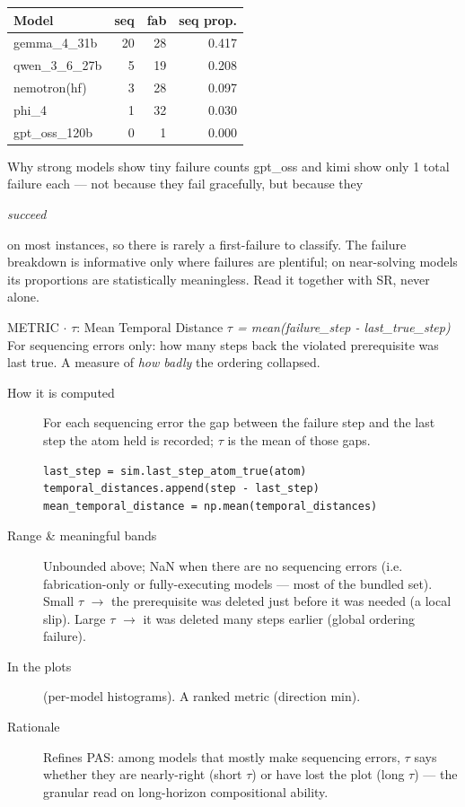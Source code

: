\begin{table}[h]\small
\centering
\begin{tabular}{@{}l r r r@{}}
\toprule
Model & seq & fab & seq prop.\\
\midrule
gemma\_4\_31b & 20 & 28 & 0.417\\
\addlinespace
qwen\_3\_6\_27b & 5 & 19 & 0.208\\
\addlinespace
nemotron(hf) & 3 & 28 & 0.097\\
\addlinespace
phi\_4 & 1 & 32 & 0.030\\
\addlinespace
gpt\_oss\_120b & 0 & 1 & 0.000\\
\bottomrule
\end{tabular}
\end{table}

\begin{bmcavbox}{Why strong models show tiny failure counts}
gpt\_oss and kimi show only 1 total failure each --- not because they fail gracefully, but because they

\emph{succeed}

on most instances, so there is rarely a first-failure to classify. The failure breakdown is informative only where failures are plentiful; on near-solving models its proportions are statistically meaningless. Read it together with SR, never alone.
\end{bmcavbox}

\begin{bmmcard}{METRIC \(\cdot\) \(\tau\): Mean Temporal Distance}
\emph{\(\tau\) = mean(failure\_step - last\_true\_step)}
For sequencing errors only: how many steps back the violated prerequisite was last true. A measure of \emph{how badly} the ordering collapsed.
\begin{description}
\item[How it is computed] For each sequencing error the gap between the failure step and the last step the atom held is recorded; \(\tau\) is the mean of those gaps.

\begin{lstlisting}
last_step = sim.last_step_atom_true(atom)
temporal_distances.append(step - last_step)
mean_temporal_distance = np.mean(temporal_distances)
\end{lstlisting}
\item[Range \& meaningful bands] Unbounded above; NaN when there are no sequencing errors (i.e. fabrication-only or fully-executing models --- most of the bundled set). Small \(\tau\) \(\rightarrow\) the prerequisite was deleted just before it was needed (a local slip). Large \(\tau\) \(\rightarrow\) it was deleted many steps earlier (global ordering failure).
\item[In the plots] (per-model histograms). A ranked metric (direction min).
\item[Rationale] Refines PAS: among models that mostly make sequencing errors, \(\tau\) says whether they are nearly-right (short \(\tau\)) or have lost the plot (long \(\tau\)) --- the granular read on long-horizon compositional ability.
\end{description}
\end{bmmcard}

